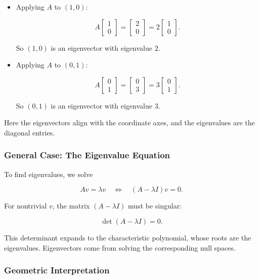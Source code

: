 \documentclass[
  letterpaper,
  DIV=11,
  numbers=noendperiod]{scrreprt}
\begin{document}
\begin{itemize}
\item
  Applying \(A\) to \((1,0)\):

  \[
  A \begin{bmatrix} 1 \\ 0 \end{bmatrix} = \begin{bmatrix} 2 \\ 0 \end{bmatrix} = 2 \begin{bmatrix} 1 \\ 0 \end{bmatrix}.
  \]

  So \((1,0)\) is an eigenvector with eigenvalue \(2\).
\item
  Applying \(A\) to \((0,1)\):

  \[
  A \begin{bmatrix} 0 \\ 1 \end{bmatrix} = \begin{bmatrix} 0 \\ 3 \end{bmatrix} = 3 \begin{bmatrix} 0 \\ 1 \end{bmatrix}.
  \]

  So \((0,1)\) is an eigenvector with eigenvalue \(3\).
\end{itemize}

Here the eigenvectors align with the coordinate axes, and the
eigenvalues are the diagonal entries.

\subsubsection{General Case: The Eigenvalue
Equation}\label{general-case-the-eigenvalue-equation}

To find eigenvalues, we solve

\[
Av = \lambda v \quad \Leftrightarrow \quad (A - \lambda I)v = 0.
\]

For nontrivial \(v\), the matrix \((A - \lambda I)\) must be singular:

\[
\det(A - \lambda I) = 0.
\]

This determinant expands to the characteristic polynomial, whose roots
are the eigenvalues. Eigenvectors come from solving the corresponding
null spaces.

\subsubsection{Geometric
Interpretation}\label{geometric-interpretation-14}
\end{document}
